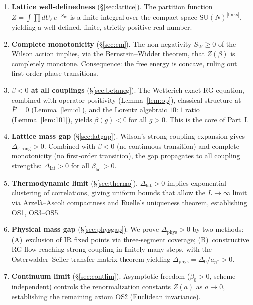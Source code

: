 \documentclass[12pt,a4paper]{article}
\theoremstyle{plain}
\theoremstyle{definition}
\theoremstyle{remark}
\begin{document}
\begin{enumerate}[label=\textbf{S\arabic*},leftmargin=3em]
\item \textbf{Lattice well-definedness} (\S\ref{sec:lattice}). The partition function $Z=\int\prod dU_\ell\,e^{-S_W}$ is a finite integral over the compact space $\mathrm{SU}(N)^{|\mathrm{links}|}$, yielding a well-defined, finite, strictly positive real number.

\item \textbf{Complete monotonicity} (\S\ref{sec:cm}). The non-negativity $S_W\geq 0$ of the Wilson action implies, via the Bernstein--Widder theorem, that $Z(\beta)$ is completely monotone. Consequence: the free energy is concave, ruling out first-order phase transitions.

\item \textbf{$\beta<0$ at all couplings} (\S\ref{sec:betaneg}). The Wetterich exact RG equation, combined with operator positivity (Lemma~\ref{lem:op}), classical structure at $\bar{F}=0$ (Lemma~\ref{lem:cl}), and the Lorentz algebraic $10{:}1$ ratio (Lemma~\ref{lem:101}), yields $\beta(g)<0$ for all $g>0$. This is the core of Part~I.

\item \textbf{Lattice mass gap} (\S\ref{sec:latgap}). Wilson's strong-coupling expansion gives $\Delta_{\mathrm{strong}}>0$. Combined with $\beta<0$ (no continuous transition) and complete monotonicity (no first-order transition), the gap propagates to all coupling strengths: $\Delta_{\mathrm{lat}}>0$ for all $\beta_{\mathrm{lat}}>0$.

\item \textbf{Thermodynamic limit} (\S\ref{sec:thermo}). $\Delta_{\mathrm{lat}}>0$ implies exponential clustering of correlations, giving uniform bounds that allow the $L\to\infty$ limit via Arzel\`a--Ascoli compactness and Ruelle's uniqueness theorem, establishing OS1, OS3--OS5.

\item \textbf{Physical mass gap} (\S\ref{sec:physgap}). We prove $\Delta_{\mathrm{phys}}>0$ by two methods: (A)~exclusion of IR fixed points via three-segment coverage; (B)~constructive RG flow reaching strong coupling in finitely many steps, with the Osterwalder--Seiler transfer matrix theorem yielding $\Delta_{\mathrm{phys}}=\Delta_0/a_{n^*}>0$.

\item \textbf{Continuum limit} (\S\ref{sec:contlim}). Asymptotic freedom ($\beta_0>0$, scheme-independent) controls the renormalization constants $Z(a)$ as $a\to 0$, establishing the remaining axiom OS2 (Euclidean invariance).
\end{enumerate}
\end{document}
